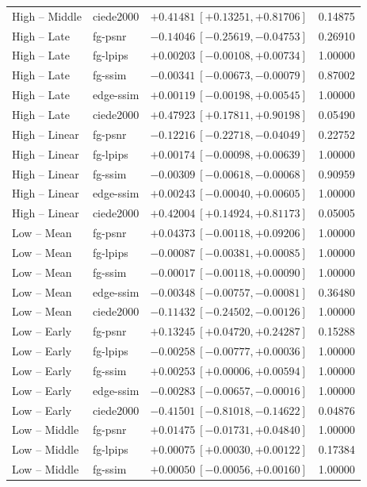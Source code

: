 \documentclass[11pt]{article}
\begin{document}
\begin{longtable}{llrr}
High -- Middle & ciede2000 & $+0.41481\ [+0.13251,+0.81706]$ & 0.14875 \\
High -- Late & fg-psnr & $-0.14046\ [-0.25619,-0.04753]$ & 0.26910 \\
High -- Late & fg-lpips & $+0.00203\ [-0.00108,+0.00734]$ & 1.00000 \\
High -- Late & fg-ssim & $-0.00341\ [-0.00673,-0.00079]$ & 0.87002 \\
High -- Late & edge-ssim & $+0.00119\ [-0.00198,+0.00545]$ & 1.00000 \\
High -- Late & ciede2000 & $+0.47923\ [+0.17811,+0.90198]$ & 0.05490 \\
High -- Linear & fg-psnr & $-0.12216\ [-0.22718,-0.04049]$ & 0.22752 \\
High -- Linear & fg-lpips & $+0.00174\ [-0.00098,+0.00639]$ & 1.00000 \\
High -- Linear & fg-ssim & $-0.00309\ [-0.00618,-0.00068]$ & 0.90959 \\
High -- Linear & edge-ssim & $+0.00243\ [-0.00040,+0.00605]$ & 1.00000 \\
High -- Linear & ciede2000 & $+0.42004\ [+0.14924,+0.81173]$ & 0.05005 \\
Low -- Mean & fg-psnr & $+0.04373\ [-0.00118,+0.09206]$ & 1.00000 \\
Low -- Mean & fg-lpips & $-0.00087\ [-0.00381,+0.00085]$ & 1.00000 \\
Low -- Mean & fg-ssim & $-0.00017\ [-0.00118,+0.00090]$ & 1.00000 \\
Low -- Mean & edge-ssim & $-0.00348\ [-0.00757,-0.00081]$ & 0.36480 \\
Low -- Mean & ciede2000 & $-0.11432\ [-0.24502,-0.00126]$ & 1.00000 \\
Low -- Early & fg-psnr & $+0.13245\ [+0.04720,+0.24287]$ & 0.15288 \\
Low -- Early & fg-lpips & $-0.00258\ [-0.00777,+0.00036]$ & 1.00000 \\
Low -- Early & fg-ssim & $+0.00253\ [+0.00006,+0.00594]$ & 1.00000 \\
Low -- Early & edge-ssim & $-0.00283\ [-0.00657,-0.00016]$ & 1.00000 \\
Low -- Early & ciede2000 & $-0.41501\ [-0.81018,-0.14622]$ & 0.04876 \\
Low -- Middle & fg-psnr & $+0.01475\ [-0.01731,+0.04840]$ & 1.00000 \\
Low -- Middle & fg-lpips & $+0.00075\ [+0.00030,+0.00122]$ & 0.17384 \\
Low -- Middle & fg-ssim & $+0.00050\ [-0.00056,+0.00160]$ & 1.00000 \\

\end{longtable}
\end{document}
